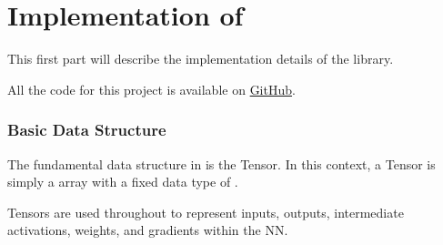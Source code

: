\part{Implementation of \mfnet}

This first part will describe the implementation details of the \mfnet library.

All the code for this project is available on \href{https://www.github.com/marchfra/mfnet}{GitHub}.

\section{Basic Data Structure}

The fundamental data structure in \mfnet is the Tensor. In this context, a Tensor is simply a 
array with a fixed data type of . 

Tensors are used throughout \mfnet to represent inputs, outputs, intermediate activations, weights, and
gradients within the \acl{NN}.
